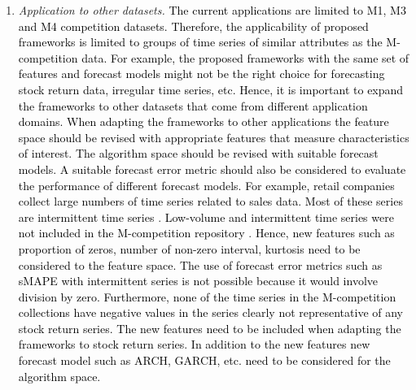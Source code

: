 \documentclass{monashthesis}
\begin{document}
\begin{enumerate}
\def\labelenumi{\arabic{enumi}.}
\item
  \emph{Application to other datasets.} \textcolor{black}{The current applications are limited to M1, M3 and M4 competition datasets. Therefore, the applicability of proposed frameworks is limited to groups of time series of similar attributes as the M-competition data. For example, the proposed frameworks with the same set of features and forecast models might not be the right choice for forecasting stock return data, irregular time series, etc. Hence, it is important to expand the frameworks to other datasets that come from different application domains. When adapting the frameworks to other applications the feature space should be revised with appropriate features that measure characteristics of interest. The algorithm space should be revised with suitable forecast models. A suitable forecast error metric should also be considered to evaluate the performance of different forecast models. For example, retail companies collect large numbers of time series related to sales data. Most of these series are intermittent time series} \autocite{seaman2018considerations}. \textcolor{black}{Low-volume and intermittent time series were not included in the M-competition repository} \autocite{makridakis2019m4}. \textcolor{black}{Hence, new features such as proportion of zeros, number of non-zero interval, kurtosis need to be considered to the feature space. The use of forecast error metrics such as sMAPE with intermittent series is not possible because it would involve division by zero. Furthermore, none of the time series in the M-competition collections have negative values in the series clearly not representative of any stock return series. The new features need to be included when adapting the frameworks to stock return series. In addition to the new features new forecast model such as ARCH, GARCH, etc. need to be considered for the algorithm space.}


\end{enumerate}
\end{document}
